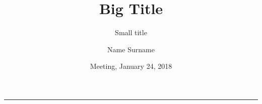 \documentclass{beamer}
\title{Big Title}
\subtitle{Small title}
\author{Name Surname}
\institute{Excellent University}
\date{Meeting, January 24, 2018}
\begin{document}
\frame{\titlepage}

\begin{frame}
    \rule{2pt}{1cm}
\end{frame}
\end{document}
